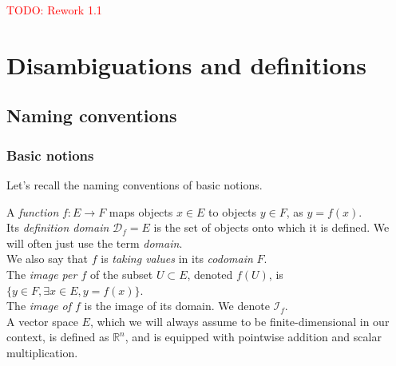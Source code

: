 \documentclass{article}
\theoremstyle{definition}
\newcommand{\domain}{\mathcal{D}}
\newcommand{\image}{\mathcal{I}}
\newcommand{\real}{\mathbb{R}}
\begin{document}
\textcolor{red}{TODO: Rework 1.1}

\section{Disambiguations and definitions}






\subsection{Naming conventions}
\label{basic}

\subsubsection{Basic notions}

Let's recall the naming conventions of basic notions.

A \emph{function} $f: E \rightarrow F$ maps objects $x \in E$ to objects $y \in F$, as $y = f(x)$.\\
Its \emph{definition domain} $\domain_f = E$ is the set of objects onto which it is defined. We will often just use the term \emph{domain}.\\
We also say that $f$ is \emph{taking values} in its \emph{codomain} $F$.\\
The \emph{image per $f$} of the subset $U \subset E$, denoted $f(U)$, is $\{y \in F, \exists x \in E, y = f(x)\}$.\\
The \emph{image of $f$} is the image of its domain. We denote $\image_f$.\\
A vector space $E$, which we will always assume to be finite-dimensional in our context, is defined as $\real^n$, and is equipped with pointwise addition and scalar multiplication.%
\end{document}
